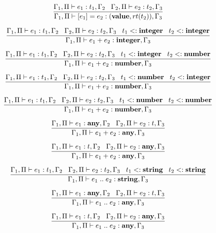 \[
\dfrac{\Gamma_{1}, \Pi \vdash e_{1}:t_{1}, \Gamma_{2} \;\;\;
       \Gamma_{2}, \Pi \vdash e_{2}:t_{2}, \Gamma_{3}}
      {\Gamma_{1}, \Pi \vdash [e_{1}] = e_{2}: (\mathbf{value},rt(t_{2})), \Gamma_{3}}
\]

\[
\dfrac{\Gamma_{1}, \Pi \vdash e_{1}:t_{1}, \Gamma_{2} \;\;\;
       \Gamma_{2}, \Pi \vdash e_{2}:t_{2}, \Gamma_{3} \;\;\;
       t_{1} <: \mathbf{integer} \;\;\;
       t_{2} <: \mathbf{integer}}
      {\Gamma_{1}, \Pi \vdash e_{1} + e_{2}:\mathbf{integer}, \Gamma_{3}}
\]

\[
\dfrac{\Gamma_{1}, \Pi \vdash e_{1}:t_{1}, \Gamma_{2} \;\;\;
       \Gamma_{2}, \Pi \vdash e_{2}:t_{2}, \Gamma_{3} \;\;\;
       t_{1} <: \mathbf{integer} \;\;\;
       t_{2} <: \mathbf{number}}
      {\Gamma_{1}, \Pi \vdash e_{1} + e_{2}:\mathbf{number}, \Gamma_{3}}
\]

\[
\dfrac{\Gamma_{1}, \Pi \vdash e_{1}:t_{1}, \Gamma_{2} \;\;\;
       \Gamma_{2}, \Pi \vdash e_{2}:t_{2}, \Gamma_{3} \;\;\;
       t_{1} <: \mathbf{number} \;\;\;
       t_{2} <: \mathbf{integer}}
      {\Gamma_{1}, \Pi \vdash e_{1} + e_{2}:\mathbf{number}, \Gamma_{3}}
\]

\[
\dfrac{\Gamma_{1}, \Pi \vdash e_{1}:t_{1}, \Gamma_{2} \;\;\;
       \Gamma_{2}, \Pi \vdash e_{2}:t_{2}, \Gamma_{3} \;\;\;
       t_{1} <: \mathbf{number} \;\;\;
       t_{2} <: \mathbf{number}}
      {\Gamma_{1}, \Pi \vdash e_{1} + e_{2}:\mathbf{number}, \Gamma_{3}}
\]

\[
\dfrac{\Gamma_{1}, \Pi \vdash e_{1}:\mathbf{any}, \Gamma_{2} \;\;\;
       \Gamma_{2}, \Pi \vdash e_{2}:t, \Gamma_{3}}
      {\Gamma_{1}, \Pi \vdash e_{1} + e_{2}:\mathbf{any}, \Gamma_{3}}
\]

\[
\dfrac{\Gamma_{1}, \Pi \vdash e_{1}:t, \Gamma_{2} \;\;\;
       \Gamma_{2}, \Pi \vdash e_{2}:\mathbf{any}, \Gamma_{3}}
      {\Gamma_{1}, \Pi \vdash e_{1} + e_{2}:\mathbf{any}, \Gamma_{3}}
\]

\[
\dfrac{\Gamma_{1}, \Pi \vdash e_{1}:t_{1}, \Gamma_{2} \;\;\;
       \Gamma_{2}, \Pi \vdash e_{2}:t_{2}, \Gamma_{3} \;\;\;
       t_{1} <: \mathbf{string} \;\;\;
       t_{2} <: \mathbf{string}}
      {\Gamma_{1}, \Pi \vdash e_{1} \; {..} \; e_{2}:\mathbf{string}, \Gamma_{3}}
\]

\[
\dfrac{\Gamma_{1}, \Pi \vdash e_{1}:\mathbf{any}, \Gamma_{2} \;\;\;
       \Gamma_{2}, \Pi \vdash e_{2}:t, \Gamma_{3}}
      {\Gamma_{1}, \Pi \vdash e_{1} \; {..} \; e_{2}:\mathbf{any}, \Gamma_{3}}
\]

\[
\dfrac{\Gamma_{1}, \Pi \vdash e_{1}:t, \Gamma_{2} \;\;\;
       \Gamma_{2}, \Pi \vdash e_{2}:\mathbf{any}, \Gamma_{3}}
      {\Gamma_{1}, \Pi \vdash e_{1} \; {..} \; e_{2}:\mathbf{any}, \Gamma_{3}}
\]

